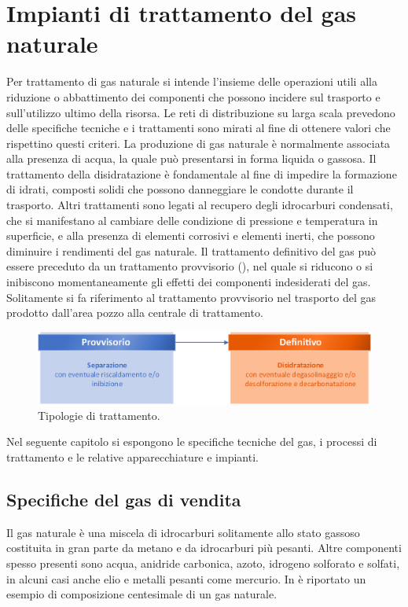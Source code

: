 \clearpage{\pagestyle{empty}\cleardoublepage}
\chapter{Impianti di trattamento del gas naturale}\thispagestyle{empty}
Per trattamento di gas naturale si intende l'insieme delle operazioni utili alla riduzione o abbattimento dei componenti che possono incidere sul trasporto e sull'utilizzo ultimo della risorsa. Le reti di distribuzione su larga scala prevedono delle specifiche tecniche e i trattamenti sono mirati al fine di ottenere valori che rispettino questi criteri. La produzione di gas naturale è normalmente associata alla presenza di acqua, la quale può presentarsi in forma liquida o gassosa. Il trattamento della disidratazione è fondamentale al fine di impedire la formazione di idrati, composti solidi che possono danneggiare le condotte durante il trasporto. Altri trattamenti sono legati al recupero degli idrocarburi condensati, che si manifestano al cambiare delle condizione di pressione e temperatura in superficie, e alla presenza di elementi corrosivi e elementi inerti, che possono diminuire i rendimenti del gas naturale.
Il trattamento definitivo del gas può essere preceduto da un trattamento provvisorio (), nel quale si riducono o si inibiscono momentaneamente gli effetti dei componenti indesiderati del gas. Solitamente si fa riferimento al trattamento provvisorio nel trasporto del gas prodotto dall'area pozzo alla centrale di trattamento.

\begin{figure}[htbp]
    \centering
    \includegraphics[width=\textwidth]{fig/impianti/generaltreatment.eps}
    \caption{Tipologie di trattamento.}
    \label{fig:generaltreatment}
\end{figure}

Nel seguente capitolo si espongono le specifiche tecniche del gas, i processi di trattamento e le relative apparecchiature e impianti.

\section{Specifiche del gas di vendita}
Il gas naturale è una miscela di idrocarburi solitamente allo stato gassoso costituita in gran parte da metano e da idrocarburi più pesanti. Altre componenti spesso presenti sono acqua, anidride carbonica, azoto, idrogeno solforato e solfati, in alcuni casi anche elio e metalli pesanti come mercurio. In  è riportato un esempio di composizione centesimale di un gas naturale. 

